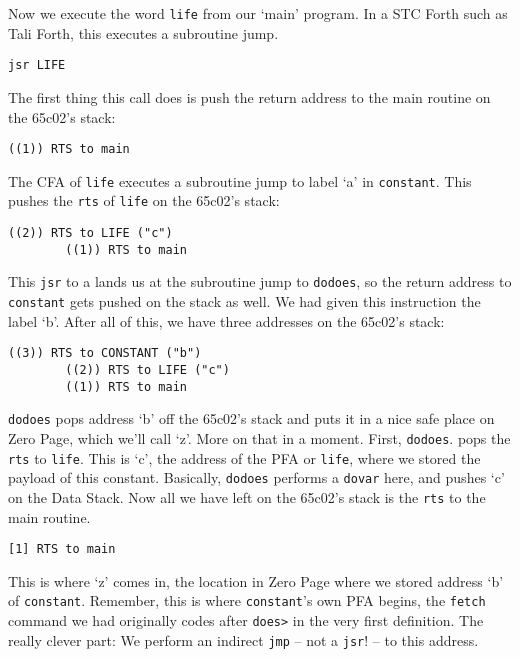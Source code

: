 Now we execute the word \texttt{life} from our `main' program. In a STC Forth
such as Tali Forth, this executes a subroutine jump.

\begin{lstlisting}[frame=lines]
        jsr LIFE
\end{lstlisting}

\noindent The first thing this call does is push the return address to the main routine
on the 65c02's stack: 

\begin{lstlisting}[frame=lines]
        ((1)) RTS to main
\end{lstlisting}

\noindent The CFA of \texttt{life} executes a subroutine jump to label `a' in
\texttt{constant}. This pushes the \texttt{rts} of \texttt{life} on the 65c02's
stack:

\begin{lstlisting}[frame=lines]
        ((2)) RTS to LIFE ("c")
        ((1)) RTS to main
\end{lstlisting}

\noindent This \texttt{jsr} to a lands us at the subroutine jump to \texttt{dodoes}, so
the return address to \texttt{constant} gets pushed on the stack as well. We had
given this instruction the label `b'. After all of this, we have three addresses
on the 65c02's stack: 

\begin{lstlisting}[frame=lines]
        ((3)) RTS to CONSTANT ("b") 
        ((2)) RTS to LIFE ("c") 
        ((1)) RTS to main
\end{lstlisting}

\noindent \texttt{dodoes} pops address `b' off the 65c02's stack and puts it in a nice
safe place on Zero Page, which we'll call `z'. More on that in a moment. First,
\texttt{dodoes}.  pops the \texttt{rts} to \texttt{life}. This is `c', the
address of the PFA or \texttt{life}, where we stored the payload of this
constant. Basically, \texttt{dodoes} performs a \texttt{dovar} here, and
pushes `c' on the Data Stack. Now all we have left on the 65c02's stack is the
\texttt{rts} to the main routine.  
 
\begin{lstlisting}[frame=lines]
        [1] RTS to main
\end{lstlisting}

\noindent This is where `z' comes in, the location in Zero Page where we stored address
`b' of \texttt{constant}. Remember, this is where \texttt{constant}'s own PFA
begins, the \texttt{fetch} command we had originally codes after \texttt{does>}
in the very first definition. The really clever part: We perform an indirect
\texttt{jmp} -- not a \texttt{jsr}! -- to this address.

